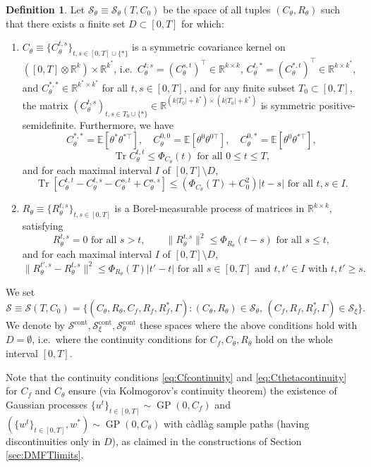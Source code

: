\documentclass[11pt,letterpaper,reqno]{amsart}
\theoremstyle{definition}
\newtheorem{defi}[thm]{Definition}
\def\E{\mathbb{E}}
\def\R{\mathbb{R}}
\def\Tr{\operatorname{Tr}}
\def\GP{\operatorname{GP}}
\def\cS{\mathcal{S}}
\def\Ct{C_\theta}
\def\Rt{R_\theta}
\def\pCt{\Phi_{\Ct}}
\def\pRt{\Phi_{\Rt}}
\begin{document}
\begin{defi}
Let ${\mathcal{S}}_\theta \equiv {\mathcal{S}}_\theta(T,C_0)$ be the space of
all tuples $(C_\theta,R_\theta)$ such that there exists a finite set $D \subset [0,T]$
for which:
    \begin{enumerate}
        \item $\Ct \equiv \{\Ct^{t,s}\}_{t,s \in [0,T] \cup \{*\}}$ is a symmetric
covariance kernel on $([0,T] \otimes \R^k) \times \R^{k^*}$, i.e.\
$\Ct^{t,s}=(\Ct^{s,t})^\top \in \R^{k \times k}$,
$\Ct^{t,*}=(\Ct^{*,t})^\top \in \R^{k \times k^*}$, and
$\Ct^{*,*} \in \R^{k^* \times k^*}$ for all $t,s \in [0,T]$, and
for any finite subset $T_0 \subset [0,T]$,
the matrix $(\Ct^{t,s})_{t,s \in T_0 \cup \{*\}} \in \R^{(k|T_0|+k^*) \times
(k|T_0|+k^*)}$ is symmetric positive-semidefinite. Furthermore,
we have
\[\Ct^{*,*}=\E[\theta^*\theta^{*\top}],
\quad \Ct^{0,0}=\E[\theta^0\theta^{0\top}],
\quad \Ct^{0,*}=\E[\theta^0\theta^{*\top}],\]
\[\Tr \Ct^{t,t} \leq \pCt(t) \text{ for all } 0\leq t\leq T,\]
and for each maximal interval $I$ of $[0,T]\setminus D$,
        \begin{equation}\label{eq:Cthetacontinuity}
            \Tr[\Ct^{t,t}-\Ct^{t,s}-\Ct^{s,t}+\Ct^{s,s}] \leq 
(\Phi_{C_\theta}(T)+C_0^2)|t-s|
\text{ for all } t,s \in I.
        \end{equation}
        \item $\Rt \equiv \{\Rt^{t,s}\}_{t,s \in [0,T]}$ is a Borel-measurable
process of matrices in $\R^{k \times k}$, satisfying
\[\Rt^{t,s}=0 \text{ for all $s>t$},
\qquad
\|\Rt^{t,s}\|^2 \leq \pRt(t-s) \text{ for all } s \leq t,\]
and for each maximal interval $I$ of $[0,T] \setminus D$,
\[\|\Rt^{t',s}-\Rt^{t,s}\|^2 \leq \Phi_{R_\theta}(T)|t'-t|
\text{ for all } s \in [0,T] \text{ and }
t,t' \in I \text{ with } t,t' \geq s.\]
\end{enumerate}
We set
\[\cS \equiv \cS(T,C_0)=\{(C_\theta,R_\theta,C_f,R_f,R_f^*,\Gamma):
(C_\theta,R_\theta) \in \cS_\theta,\,(C_f,R_f,R_f^*,\Gamma) \in \cS_\xi\}.\]
We denote by
$\cS^{\mathrm{cont}},\cS_\xi^{\mathrm{cont}},\cS_\theta^{\mathrm{cont}}$
these spaces where the above conditions hold with $D=\emptyset$,
i.e.\ where the continuity conditions for
$C_f,C_\theta,R_\theta$ hold on the whole interval $[0,T]$. 
\end{defi}

Note that the continuity conditions \eqref{eq:Cfcontinuity} and
\eqref{eq:Cthetacontinuity} for $C_f$ and $C_\theta$ 
ensure (via Kolmogorov's continuity theorem) 
the existence of Gaussian processes $\{u^t\}_{t \in [0,T]} \sim \GP(0,C_f)$ 
and $(\{w^t\}_{t \in [0,T]},w^*) \sim \GP(0,C_\theta)$ with c\`adl\`ag sample
paths (having discontinuities only in $D$),
as claimed in the constructions of Section \ref{sec:DMFTlimits}.
\end{document}
